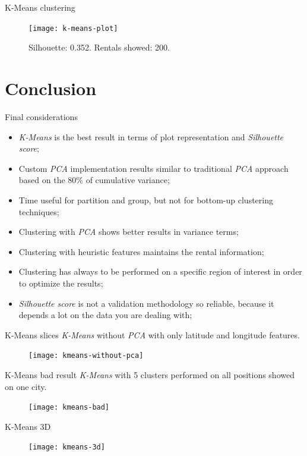 \documentclass{beamer}
\begin{document}
\begin{frame}{K-Means clustering}
\begin{figure}[bt]
	\centering
	\texttt{[image: k-means-plot]}
	\caption{Silhouette: 0.352. Rentals showed: 200.}
	\label{fig:k-means-line}
\end{figure}
\end{frame}

\section{Conclusion}
\begin{frame}{Final considerations}
\begin{itemize}
	\item \textit{K-Means} is the best result in terms of plot representation and \textit{Silhouette score};
	\item Custom \textit{PCA} implementation results similar to traditional \textit{PCA} approach based on the $80\%$ of cumulative variance;
	\item Time useful for partition and group, but not for bottom-up clustering techniques;
	\item Clustering with \textit{PCA} shows better results in variance terms;
	\item Clustering with heuristic features maintains the rental information;
	\item Clustering has always to be performed on a specific region of interest in order to optimize the results;
	\item \textit{Silhouette score} is not a validation methodology so reliable, because it depends a lot on the data you are dealing with;
\end{itemize}
\end{frame}

\begin{frame}{K-Means slices}
\textit{K-Means} without \textit{PCA} with only latitude and longitude features.
\begin{figure}[bt]
	\centering
	\texttt{[image: kmeans-without-pca]}
	\label{fig:kmeans-without-pca}
\end{figure}
\end{frame}

\begin{frame}{K-Means bad result}
\textit{K-Means} with 5 clusters performed on all positions showed on one city.
\begin{figure}[bt]
	\centering
	\texttt{[image: kmeans-bad]}
	\label{fig:kmeans-bad}
\end{figure}
\end{frame}

\begin{frame}{K-Means 3D}
\begin{figure}[bt]
	\centering
	\texttt{[image: kmeans-3d]}
	\label{fig:kmeans-3d}
\end{figure}
\end{frame}
\end{document}

